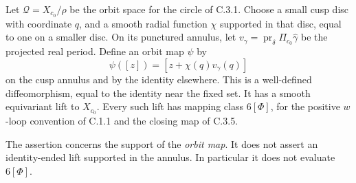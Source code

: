\begin{proposition}
Let $\mathcal Q=X_{c_0}/\rho$ be the orbit space for the circle of
C.3.1. Choose a small cusp disc with coordinate $q$, and a smooth
radial function $\chi$ supported in that disc, equal to one on a
smaller disc. On its punctured annulus, let
$v_\gamma=\operatorname{pr}_{\delta}\Pi_{c_0}\widehat\gamma$
be the projected real period. Define an orbit map $\psi$ by
\[
 \psi([z])=[z+\chi(q)v_\gamma(q)]
\]
on the cusp annulus and by the identity elsewhere. This is a
well-defined diffeomorphism, equal to the identity near the fixed
set. It has a smooth equivariant lift to $X_{c_0}$. Every such lift
has mapping class $6[\Phi]$, for the positive $w$-loop convention
of C.1.1 and the closing map of C.3.5.

The assertion concerns the support of the \emph{orbit map}.
It does not assert an identity-ended lift supported in the annulus.
In particular it does not evaluate $6[\Phi]$.
\end{proposition}
